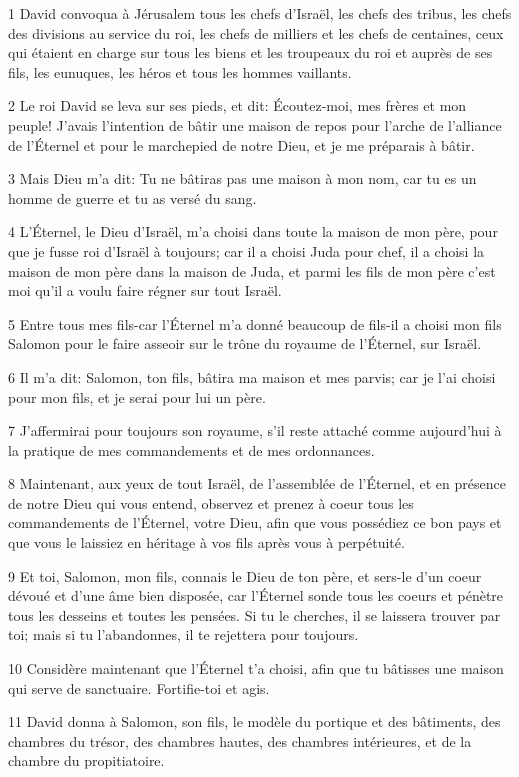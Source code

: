\par 1 David convoqua à Jérusalem tous les chefs d'Israël, les chefs des tribus, les chefs des divisions au service du roi, les chefs de milliers et les chefs de centaines, ceux qui étaient en charge sur tous les biens et les troupeaux du roi et auprès de ses fils, les eunuques, les héros et tous les hommes vaillants.
\par 2 Le roi David se leva sur ses pieds, et dit: Écoutez-moi, mes frères et mon peuple! J'avais l'intention de bâtir une maison de repos pour l'arche de l'alliance de l'Éternel et pour le marchepied de notre Dieu, et je me préparais à bâtir.
\par 3 Mais Dieu m'a dit: Tu ne bâtiras pas une maison à mon nom, car tu es un homme de guerre et tu as versé du sang.
\par 4 L'Éternel, le Dieu d'Israël, m'a choisi dans toute la maison de mon père, pour que je fusse roi d'Israël à toujours; car il a choisi Juda pour chef, il a choisi la maison de mon père dans la maison de Juda, et parmi les fils de mon père c'est moi qu'il a voulu faire régner sur tout Israël.
\par 5 Entre tous mes fils-car l'Éternel m'a donné beaucoup de fils-il a choisi mon fils Salomon pour le faire asseoir sur le trône du royaume de l'Éternel, sur Israël.
\par 6 Il m'a dit: Salomon, ton fils, bâtira ma maison et mes parvis; car je l'ai choisi pour mon fils, et je serai pour lui un père.
\par 7 J'affermirai pour toujours son royaume, s'il reste attaché comme aujourd'hui à la pratique de mes commandements et de mes ordonnances.
\par 8 Maintenant, aux yeux de tout Israël, de l'assemblée de l'Éternel, et en présence de notre Dieu qui vous entend, observez et prenez à coeur tous les commandements de l'Éternel, votre Dieu, afin que vous possédiez ce bon pays et que vous le laissiez en héritage à vos fils après vous à perpétuité.
\par 9 Et toi, Salomon, mon fils, connais le Dieu de ton père, et sers-le d'un coeur dévoué et d'une âme bien disposée, car l'Éternel sonde tous les coeurs et pénètre tous les desseins et toutes les pensées. Si tu le cherches, il se laissera trouver par toi; mais si tu l'abandonnes, il te rejettera pour toujours.
\par 10 Considère maintenant que l'Éternel t'a choisi, afin que tu bâtisses une maison qui serve de sanctuaire. Fortifie-toi et agis.
\par 11 David donna à Salomon, son fils, le modèle du portique et des bâtiments, des chambres du trésor, des chambres hautes, des chambres intérieures, et de la chambre du propitiatoire.
